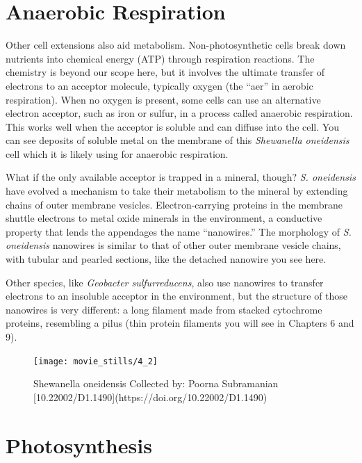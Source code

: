 \documentclass[]{tufte-book}
\begin{document}
\section{Anaerobic Respiration}\label{anaerobic-respiration}

Other cell extensions also aid metabolism. Non-photosynthetic cells
break down nutrients into chemical energy (ATP) through respiration
reactions. The chemistry is beyond our scope here, but it involves the
ultimate transfer of electrons to an acceptor molecule, typically oxygen
(the ``aer'' in aerobic respiration). When no oxygen is present, some
cells can use an alternative electron acceptor, such as iron or sulfur,
in a process called anaerobic respiration. This works well when the
acceptor is soluble and can diffuse into the cell. You can see deposits
of soluble metal on the membrane of this \emph{Shewanella oneidensis}
cell which it is likely using for anaerobic respiration.

What if the only available acceptor is trapped in a mineral, though?
\emph{S. oneidensis} have evolved a mechanism to take their metabolism
to the mineral by extending chains of outer membrane vesicles.
Electron-carrying proteins in the membrane shuttle electrons to metal
oxide minerals in the environment, a conductive property that lends the
appendages the name ``nanowires.'' The morphology of \emph{S.
oneidensis} nanowires is similar to that of other outer membrane vesicle
chains, with tubular and pearled sections, like the detached nanowire
you see here.

Other species, like \emph{Geobacter sulfurreducens}, also use nanowires
to transfer electrons to an insoluble acceptor in the environment, but
the structure of those nanowires is very different: a long filament made
from stacked cytochrome proteins, resembling a pilus (thin protein
filaments you will see in Chapters 6 and 9).

\begin{figure}
\texttt{[image: movie\_stills/4\_2]} \caption[Shewanella oneidensis Collected by]{Shewanella oneidensis Collected by: Poorna Subramanian [10.22002/D1.1490](https://doi.org/10.22002/D1.1490)}\label{fig:unnamed-chunk-60}
\end{figure}

\section{Photosynthesis}\label{photosynthesis}
\end{document}
